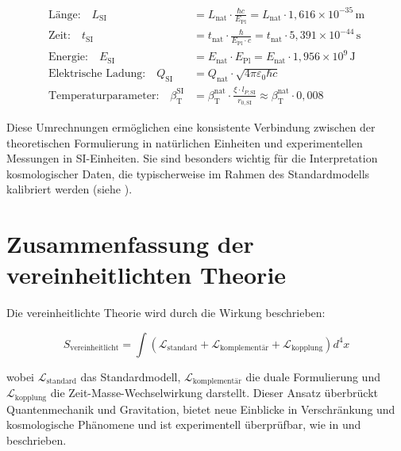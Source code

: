 \documentclass[12pt,a4paper]{article}
\newcommand{\betaT}{\beta_{\text{T}}}
\begin{document}
	\begin{tcolorbox}[colback=blue!5!white,colframe=blue!75!black,title=Umrechnungsschema zwischen Einheitensystemen]
		\begin{align}
			\text{Länge:} \quad L_{\text{SI}} &= L_{\text{nat}} \cdot \frac{\hbar c}{E_{\text{Pl}}} = L_{\text{nat}} \cdot 1,616 \times 10^{-35} \, \text{m} \\
			\text{Zeit:} \quad t_{\text{SI}} &= t_{\text{nat}} \cdot \frac{\hbar}{E_{\text{Pl}} \cdot c} = t_{\text{nat}} \cdot 5,391 \times 10^{-44} \, \text{s} \\
			\text{Energie:} \quad E_{\text{SI}} &= E_{\text{nat}} \cdot E_{\text{Pl}} = E_{\text{nat}} \cdot 1,956 \times 10^9 \, \text{J} \\
			\text{Elektrische Ladung:} \quad Q_{\text{SI}} &= Q_{\text{nat}} \cdot \sqrt{4\pi\varepsilon_0 \hbar c} \\
			\text{Temperaturparameter:} \quad \betaT^{\text{SI}} &= \betaT^{\text{nat}} \cdot \frac{\xi \cdot l_{P,\text{SI}}}{r_{0,\text{SI}}} \approx \betaT^{\text{nat}} \cdot 0,008
		\end{align}
	\end{tcolorbox}
	
	Diese Umrechnungen ermöglichen eine konsistente Verbindung zwischen der theoretischen Formulierung in natürlichen Einheiten und experimentellen Messungen in SI-Einheiten. Sie sind besonders wichtig für die Interpretation kosmologischer Daten, die typischerweise im Rahmen des Standardmodells kalibriert werden (siehe \cite{pascher_temp_2025}).
	
	\section{Zusammenfassung der vereinheitlichten Theorie}
	\label{sec:summary}
	
	Die vereinheitlichte Theorie wird durch die Wirkung beschrieben:
	
	\begin{equation}
		S_\text{vereinheitlicht} = \int \left( \mathcal{L}_\text{standard} + \mathcal{L}_\text{komplementär} + \mathcal{L}_\text{kopplung} \right) d^4x
	\end{equation}
	
	wobei \(\mathcal{L}_\text{standard}\) das Standardmodell, \(\mathcal{L}_\text{komplementär}\) die duale Formulierung und \(\mathcal{L}_\text{kopplung}\) die Zeit-Masse-Wechselwirkung darstellt. Dieser Ansatz überbrückt Quantenmechanik und Gravitation, bietet neue Einblicke in Verschränkung und kosmologische Phänomene und ist experimentell überprüfbar, wie in \cite{pascher_lagrange_2025} und \cite{pascher_emergente_gravitation_2025} beschrieben.
	
\end{document}
